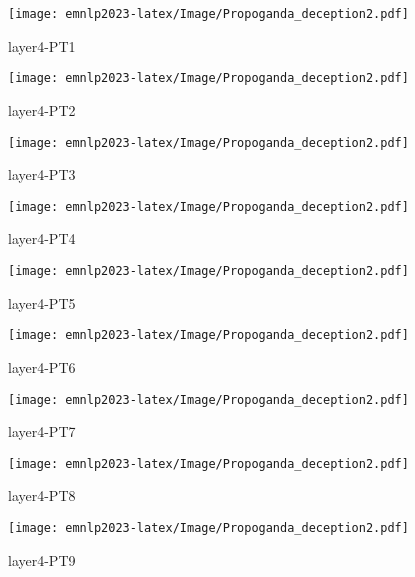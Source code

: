 \begin{figure*}[htbp]
    \begin{subfigure}[b]{0.33\textwidth}
    \centering
        \texttt{[image: emnlp2023-latex/Image/Propoganda\_deception2.pdf]}
        \caption{layer4-PT1}
    \end{subfigure}
    \begin{subfigure}[b]{0.33\textwidth}
    \centering
        \texttt{[image: emnlp2023-latex/Image/Propoganda\_deception2.pdf]}
        \caption{layer4-PT2}
    \end{subfigure}    
    \begin{subfigure}[b]{0.33\textwidth}
    \centering
        \texttt{[image: emnlp2023-latex/Image/Propoganda\_deception2.pdf]}
        \caption{layer4-PT3}
    \end{subfigure}
    \begin{subfigure}[b]{0.33\textwidth}
    \centering
        \texttt{[image: emnlp2023-latex/Image/Propoganda\_deception2.pdf]}
        \caption{layer4-PT4}
    \end{subfigure}
    \begin{subfigure}[b]{0.33\textwidth}
    \centering
        \texttt{[image: emnlp2023-latex/Image/Propoganda\_deception2.pdf]}
        \caption{layer4-PT5}
    \end{subfigure}
    \begin{subfigure}[b]{0.33\textwidth}
    \centering
        \texttt{[image: emnlp2023-latex/Image/Propoganda\_deception2.pdf]}
        \caption{layer4-PT6}
    \end{subfigure}
    \begin{subfigure}[b]{0.33\textwidth}
    \centering
        \texttt{[image: emnlp2023-latex/Image/Propoganda\_deception2.pdf]}
        \caption{layer4-PT7}
    \end{subfigure}
    \begin{subfigure}[b]{0.33\textwidth}
    \centering
        \texttt{[image: emnlp2023-latex/Image/Propoganda\_deception2.pdf]}
        \caption{layer4-PT8}
    \end{subfigure}
    \begin{subfigure}[b]{0.33\textwidth}
    \centering
        \texttt{[image: emnlp2023-latex/Image/Propoganda\_deception2.pdf]}
        \caption{layer4-PT9}
    \end{subfigure}
\end{figure*}


